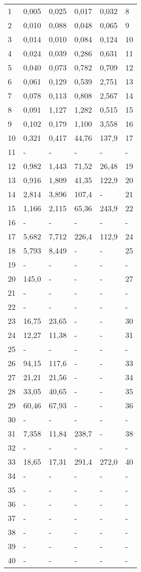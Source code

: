\begin{center}
\begin{longtable}{|l|l|l|l|l|l|}
1 & 0,005 & 0,025 & 0,017 & 0,032 & 8 \\
2 & 0,010 & 0,088 & 0,048 & 0,065 & 9 \\
3 & 0,014 & 0,010 & 0,084 & 0,124 & 10 \\
4 & 0,024 & 0,039 & 0,286 & 0,631 & 11 \\
5 & 0,040 & 0,073 & 0,782 & 0,709 & 12 \\
6 & 0,061 & 0,129 & 0,539 & 2,751 & 13 \\
7 & 0,078 & 0,113 & 0,808 & 2,567 & 14 \\
8 & 0,091 & 1,127 & 1,282 & 0,515 & 15 \\
9 & 0,102 & 0,179 & 1,100 & 3,558 & 16 \\
10 & 0,321 & 0,417 & 44,76 & 137,9 & 17 \\
11 & - & - & - & - & - \\
12 & 0,982 & 1,443 & 71,52 & 26,48 & 19 \\
13 & 0,916 & 1,809 & 41,35 & 122,9 & 20 \\
14 & 2,814 & 3,896 & 107,4 & - & 21 \\
15 & 1,166 & 2,115 & 65,36 & 243,9 & 22 \\
16 & - & - & - & - & - \\
17 & 5,682 & 7,712 & 226,4 & 112,9 & 24 \\
18 & 5,793 & 8,449 & - & - & 25 \\
19 & - & - & - & - & - \\
20 & 145,0 & - & - & - & 27 \\
21 & - & - & - & - & - \\
22 & - & - & - & - & - \\
23 & 16,75 & 23,65 & - & - & 30 \\
24 & 12,27 & 11,38 & - & - & 31 \\
25 & - & - & - & - & - \\
26 & 94,15 & 117,6 & - & - & 33 \\
27 & 21,21 & 21,56 & - & - & 34 \\
28 & 33,05 & 40,65 & - & - & 35 \\
29 & 60,46 & 67,93 & - & - & 36 \\
30 & - & - & - & - & - \\
31 & 7,358 & 11,84 & 238,7 & - & 38 \\
32 & - & - & - & - & - \\
33 & 18,65 & 17,31 & 291,4 & 272,0 & 40 \\
34 & - & - & - & - & - \\
35 & - & - & - & - & - \\
36 & - & - & - & - & - \\
37 & - & - & - & - & - \\
38 & - & - & - & - & - \\
39 & - & - & - & - & - \\
40 & - & - & - & - & - \\
\end{longtable}
\end{center}

\newpage